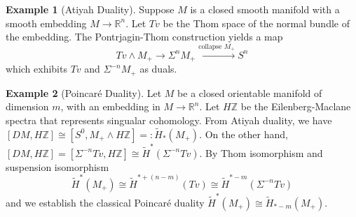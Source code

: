 \documentclass{article}
\theoremstyle{definition}
\theoremstyle{definition}
\theoremstyle{definition}
\theoremstyle{definition}
\theoremstyle{definition}
\theoremstyle{definition}
\theoremstyle{definition}
\newtheorem{example}{Example}[theorem]
\begin{document}
\begin{tcolorbox}[colback=yellow!5!white,colframe=yellow!30!white]
\begin{example}[Atiyah Duality]
Suppose $M$ is a closed smooth manifold with a smooth embedding $M\to \mathbb{R}^n$. Let $Tv$ be the Thom space of the normal bundle of the embedding. The Pontrjagin-Thom construction yields a map 
\[Tv\wedge M_+\to \Sigma^nM_+\xrightarrow{\textrm{collapse } M_+}S^n\]
which exhibits $Tv$ and $\Sigma^{-n}M_+$ as duals.
\end{example}
\end{tcolorbox}


\begin{tcolorbox}[colback=yellow!5!white,colframe=yellow!30!white]
\begin{example}[Poincar\'e Duality]
Let $M$ be a closed orientable manifold of dimension $m$, with an embedding in $M\to \mathbb{R}^n$. Let $H \mathbb{Z}$ be the Eilenberg-Maclane spectra that represents singualar cohomology. From Atiyah duality, we have $[DM,H \mathbb{Z}]\cong [S^0, M_+\wedge H \mathbb{Z}]=: \tilde{H}_*(M_+)$. On the other hand, $[DM, H \mathbb{Z}]=[\Sigma^{-n}Tv, H \mathbb{Z}]\cong \tilde{H}^{*}(\Sigma^{-n}Tv)$. By Thom isomorphism and suspension isomorphism
\[\tilde{H}^*(M_+)\cong \tilde{H}^{*+(n-m)}(Tv)\cong \tilde{H}^{*-m}(\Sigma^{-n}Tv)\]
and we establish the classical Poincar\'e duality $\tilde{H}^*(M_+)\cong \tilde{H}_{*-m}(M_+)$.
\end{example}
\end{tcolorbox}
\end{document}
